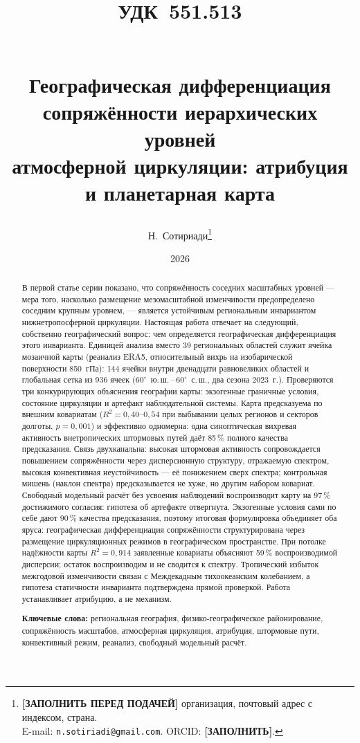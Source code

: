 \documentclass[11pt,a4paper]{article}
\title{{\normalsize\normalfont\hspace*{-\leftskip}\parbox{\linewidth}{\raggedright УДК~551.513}}\\[1.5em]
Географическая дифференциация сопряжённости иерархических уровней\\
атмосферной циркуляции: атрибуция и планетарная карта}
\author{Н.~Сотириади\thanks{%
  \textbf{[ЗАПОЛНИТЬ ПЕРЕД ПОДАЧЕЙ]} организация, почтовый адрес с индексом, страна.\\
  E-mail: \texttt{n.sotiriadi@gmail.com}. ORCID: \textbf{[ЗАПОЛНИТЬ]}.}}
\date{2026}
\begin{document}
\maketitle

\begin{abstract}
В первой статье серии показано, что сопряжённость соседних масштабных уровней --- мера того, насколько размещение мезомасштабной изменчивости предопределено соседним крупным уровнем, --- является устойчивым региональным инвариантом нижнетропосферной циркуляции. Настоящая работа отвечает на следующий, собственно географический вопрос: чем определяется географическая дифференциация этого инварианта. Единицей анализа вместо 39 региональных областей служит ячейка мозаичной карты (реанализ ERA5, относительный вихрь на изобарической поверхности 850~гПа): 144 ячейки внутри двенадцати равновеликих областей и глобальная сетка из 936 ячеек ($60^\circ$~ю.\,ш.\,--\,$60^\circ$~с.\,ш., два сезона 2023~г.). Проверяются три конкурирующих объяснения географии карты: экзогенные граничные условия, состояние циркуляции и артефакт наблюдательной системы. Карта предсказуема по внешним ковариатам ($R^2=0{,}40$--$0{,}54$ при выбывании целых регионов и секторов долготы, $p=0{,}001$) и эффективно одномерна: одна синоптическая вихревая активность внетропических штормовых путей даёт 85\,\% полного качества предсказания. Связь двухканальна: высокая штормовая активность сопровождается повышением сопряжённости через дисперсионную структуру, отражаемую спектром, высокая конвективная неустойчивость --- её понижением сверх спектра; контрольная мишень (наклон спектра) предсказывается не хуже, но другим набором ковариат. Свободный модельный расчёт без усвоения наблюдений воспроизводит карту на 97\,\% достижимого согласия: гипотеза об артефакте отвергнута. Экзогенные условия сами по себе дают 90\,\% качества предсказания, поэтому итоговая формулировка объединяет оба яруса: географическая дифференциация сопряжённости структурирована через размещение циркуляционных режимов в географическом пространстве. При потолке надёжности карты $R^2=0{,}914$ заявленные ковариаты объясняют 59\,\% воспроизводимой дисперсии; остаток воспроизводим и не сводится к спектру. Тропический избыток межгодовой изменчивости связан с Междекадным тихоокеанским колебанием, а гипотеза статичности инварианта подтверждена прямой проверкой. Работа устанавливает атрибуцию, а не механизм.

\smallskip
\noindent\textbf{Ключевые слова:} региональная география, физико-географическое районирование, сопряжённость масштабов, атмосферная циркуляция, атрибуция, штормовые пути, конвективный режим, реанализ, свободный модельный расчёт.
\end{abstract}
\end{document}
